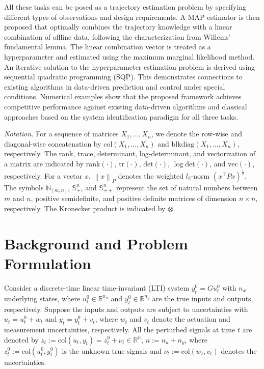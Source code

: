 \documentclass{ifacconf}
\newcommand{\norm}[1]{\left\lVert#1\right\rVert}
\newcommand{\col}[1]{\mathrm{col}\left(#1\right)}
\newcommand{\tr}[1]{\mathrm{tr}\left(#1\right)}
\newcommand{\vect}[1]{\mathrm{vec}\left(#1\right)}
\newcommand{\rank}[1]{\mathrm{rank}\left(#1\right)}
\newcommand{\blkdiag}[1]{\mathrm{blkdiag}\left(#1\right)}
\newcommand{\dett}[1]{\mathrm{det}\left(#1\right)}
\begin{document}
All these tasks can be posed as a trajectory estimation problem by specifying different types of observations and design requirements. A MAP estimator is then proposed that optimally combines the trajectory knowledge with a linear combination of offline data, following the characterization from Willems' fundamental lemma. The linear combination vector is treated as a hyperparameter and estimated using the maximum marginal likelihood method. An iterative solution to the hyperparameter estimation problem is derived using sequential quadratic programming (SQP). This demonstrates connections to existing algorithms in data-driven prediction and control under special conditions. Numerical examples show that the proposed framework achieves competitive performance against existing data-driven algorithms and classical approaches based on the system identification paradigm for all three tasks.

\textit{Notation.} For a sequence of matrices $X_1,\dots,X_n$, we denote the row-wise and diagonal-wise concatenation by $\col{X_1,\dots,X_n}$ and $\blkdiag{X_1,\dots,X_n}$, respectively. The rank, trace, determinant, log-determinant, and vectorization of a matrix are indicated by $\rank{\cdot}$, $\tr{\cdot}$, $\dett{\cdot}$, $\log\dett{\cdot}$, and $\vect{\cdot}$, respectively. For a vector $x$, $\norm{x}_P$ denotes the weighted $l_2$-norm $(x^\top Px)^{\frac{1}{2}}$. The symbols $\mathbb{N}_{[m,n]}$, $\mathbb{S}^n_+$, and $\mathbb{S}^n_{++}$ represent the set of natural numbers between $m$ and $n$, positive semidefinite, and positive definite matrices of dimension $n\times n$, respectively. The Kronecker product is indicated by $\otimes$.

\section{Background and Problem Formulation}

Consider a discrete-time linear time-invariant (LTI) system $y_t^0=Gu_t^0$ with $n_x$ underlying states, where $u_t^0\in\mathbb{R}^{n_u}$ and $y_t^0\in\mathbb{R}^{n_y}$ are the true inputs and outputs, respectively. Suppose the inputs and outputs are subject to uncertainties with $u_t=u_t^0+w_t$ and $y_t=y_t^0+v_t$, where $w_t$ and $v_t$ denote the actuation and measurement uncertainties, respectively. All the perturbed signals at time $t$ are denoted by $z_t:=\col{u_t,y_t}=z_t^0+\nu_t\in\mathbb{R}^n$, $n:=n_u+n_y$, where $z_t^0:=\col{u_t^0,y_t^0}$ is the unknown true signals and $\nu_t:=\col{w_t,v_t}$ denotes the uncertainties.
\end{document}
